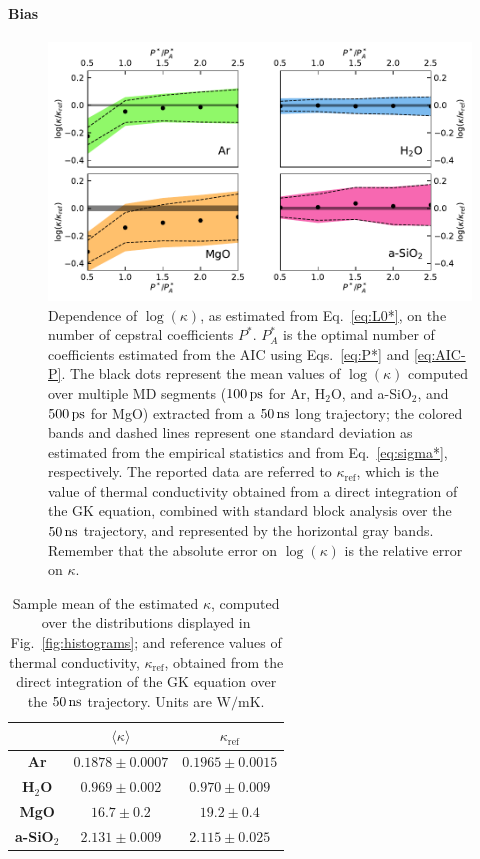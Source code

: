 \paragraph{Bias}
\begin{figure}[!tb]
    \centering
    \includegraphics[width=\textwidth]{chapters/chapter5/figures/L-vs-P.pdf}
    \caption{Dependence of $\log(\kappa)$, as estimated from Eq.~\eqref{eq:L0*}, on the number of cepstral coefficients $P^*$. $P_A^*$ is the optimal number of coefficients estimated from the AIC using Eqs.~\eqref{eq:P*} and \eqref{eq:AIC-P}. The black dots represent the mean values of $\log(\kappa)$ computed over multiple MD segments ($100\,\mathrm{ps}$ for Ar, H$_2$O, and a-SiO$_2$, and $500\,\mathrm{ps}$ for MgO) extracted from a $50\,\mathrm{ns}$ long trajectory; the colored bands and dashed lines represent one standard deviation as estimated from the empirical statistics and from Eq.~\eqref{eq:sigma*}, respectively. The reported data are referred to $\kappa_{\mathrm{ref}}$, which is the value of thermal conductivity obtained from a direct integration of the GK equation, combined with standard block analysis over the $50\,\mathrm{ns}$ trajectory, and represented by the horizontal gray bands. Remember that the absolute error on $\log(\kappa)$ is the relative error on $\kappa$.}
    \label{fig:L-vs-P}
\end{figure}
\begin{table}[!htb]
    \centering
    \begin{tabular}{ccc}
                  & $\langle\kappa\rangle$ & $\kappa_\mathrm{ref}$ \\
        \hline
        \textbf{Ar}        & $0.1878 \pm 0.0007$ & $0.1965 \pm 0.0015$ \\
        \textbf{H$_2$O}    & $0.969 \pm 0.002$   & $0.970 \pm 0.009$ \\
        \textbf{MgO}       & $16.7 \pm 0.2$      & $19.2 \pm 0.4$ \\
        \textbf{a-SiO$_2$} & $2.131 \pm 0.009$   & $2.115 \pm 0.025$ \\
    \end{tabular}
    \caption{Sample mean of the estimated $\kappa$, computed over the distributions displayed in Fig.~\ref{fig:histograms}; and reference values of thermal conductivity, $\kappa_\mathrm{ref}$, obtained from the direct integration of the GK equation over the $50\,\mathrm{ns}$ trajectory. Units are $\mathrm{W/mK}$.}
    \label{tab:kappa-bias}
\end{table}
